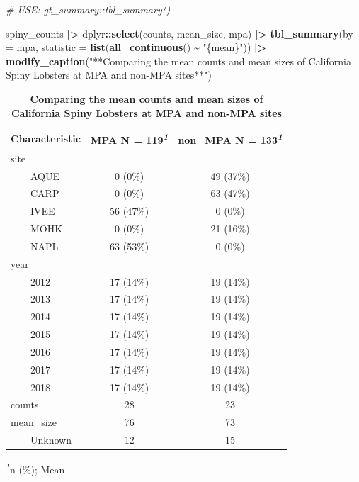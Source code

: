 \documentclass[
]{article}
\newenvironment{Shaded}{\begin{snugshade}}{\end{snugshade}}
\newcommand{\AttributeTok}[1]{\textcolor[rgb]{0.13,0.29,0.53}{#1}}
\newcommand{\CommentTok}[1]{\textcolor[rgb]{0.56,0.35,0.01}{\textit{#1}}}
\newcommand{\FunctionTok}[1]{\textcolor[rgb]{0.13,0.29,0.53}{\textbf{#1}}}
\newcommand{\NormalTok}[1]{#1}
\newcommand{\SpecialCharTok}[1]{\textcolor[rgb]{0.81,0.36,0.00}{\textbf{#1}}}
\newcommand{\StringTok}[1]{\textcolor[rgb]{0.31,0.60,0.02}{#1}}
\begin{document}
\begin{Shaded}
\begin{Highlighting}[]
\CommentTok{\# USE: gt\_summary::tbl\_summary()}

\NormalTok{spiny\_counts }\SpecialCharTok{|\textgreater{}} 
\NormalTok{    dplyr}\SpecialCharTok{::}\FunctionTok{select}\NormalTok{(counts, mean\_size, mpa) }\SpecialCharTok{|\textgreater{}}
    \FunctionTok{tbl\_summary}\NormalTok{(}\AttributeTok{by =}\NormalTok{ mpa,}
                \AttributeTok{statistic =} \FunctionTok{list}\NormalTok{(}\FunctionTok{all\_continuous}\NormalTok{() }\SpecialCharTok{\textasciitilde{}} \StringTok{"\{mean\}"}\NormalTok{)) }\SpecialCharTok{|\textgreater{}}
    \FunctionTok{modify\_caption}\NormalTok{(}\StringTok{"**Comparing the mean counts and mean sizes of California Spiny Lobsters at MPA and non{-}MPA sites**"}\NormalTok{)}
\end{Highlighting}
\end{Shaded}

\begin{table}[!t]
\caption{\label{tab:unnamed-chunk-6}\textbf{Comparing the mean counts and mean sizes of California Spiny Lobsters at MPA and non-MPA sites}} 
\fontsize{12.0pt}{14.4pt}\selectfont
\begin{tabular*}{\linewidth}{@{\extracolsep{\fill}}lcc}
\toprule
\textbf{Characteristic} & \textbf{MPA}  N = 119\textsuperscript{\textit{1}} & \textbf{non\_MPA}  N = 133\textsuperscript{\textit{1}} \\ 
\midrule\addlinespace[2.5pt]
site &  &  \\ 
    AQUE & 0 (0\%) & 49 (37\%) \\ 
    CARP & 0 (0\%) & 63 (47\%) \\ 
    IVEE & 56 (47\%) & 0 (0\%) \\ 
    MOHK & 0 (0\%) & 21 (16\%) \\ 
    NAPL & 63 (53\%) & 0 (0\%) \\ 
year &  &  \\ 
    2012 & 17 (14\%) & 19 (14\%) \\ 
    2013 & 17 (14\%) & 19 (14\%) \\ 
    2014 & 17 (14\%) & 19 (14\%) \\ 
    2015 & 17 (14\%) & 19 (14\%) \\ 
    2016 & 17 (14\%) & 19 (14\%) \\ 
    2017 & 17 (14\%) & 19 (14\%) \\ 
    2018 & 17 (14\%) & 19 (14\%) \\ 
counts & 28 & 23 \\ 
mean\_size & 76 & 73 \\ 
    Unknown & 12 & 15 \\ 
\bottomrule
\end{tabular*}
\begin{minipage}{\linewidth}
\textsuperscript{\textit{1}}n (\%); Mean\\
\end{minipage}
\end{table}
\end{document}
